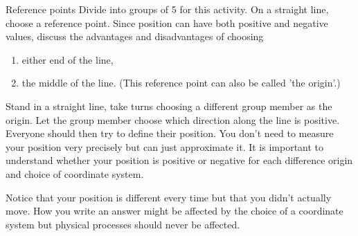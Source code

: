 \begin{groupdiscussion}{Reference points}
            \nopagebreak
        \label{m38787*id62809}Divide into groups of 5 for this activity.
On a straight line, choose a reference point. Since position can have both positive and negative values, discuss the advantages and disadvantages of choosing\par 
        \label{m38787*id62816}\begin{enumerate}[noitemsep, label=\textbf{\arabic*}. ] 
            \label{m38787*uid9}\item either end of the line,
\label{m38787*uid10}\item the middle of the line. (This reference point can also be called 'the origin'.)
\end{enumerate}
Stand in a straight line, take turns choosing a different group member as the origin. Let the group member choose
which direction along the line is positive. Everyone should then try to define their position. You don't need to measure your position very precisely but can just approximate it. It is important to understand whether your position is positive or negative for each difference origin and choice of coordinate system.

Notice that your position is different every time but that you didn't actually move. How you write an answer might be affected by the choice of a coordinate system but physical processes should never be affected.
\end{groupdiscussion}
\label{m38787*secfhsst!!!underscore!!!id138}
